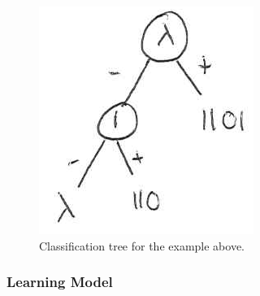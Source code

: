 \documentclass[12pt, letterpaper]{article}
\numberwithin{equation}{section} %
\theoremstyle{definition}
\theoremstyle{remark}
\begin{document}
\begin{figure}[H]
\centering
\includegraphics[width=0.3\linewidth]{img/dfa-to-tree.png}
\caption{Classification tree for the example above.}
\end{figure}

\subsubsection*{Learning Model}
\end{document}
